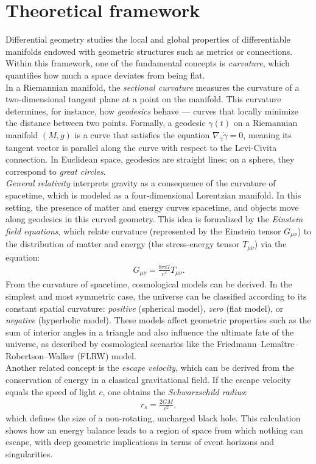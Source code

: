 \documentclass{aleph-revista}
\begin{document}
\section{Theoretical framework}
Differential geometry studies the local and global properties of differentiable manifolds endowed with geometric structures such as metrics or connections. Within this framework, one of the fundamental concepts is \textit{curvature}, which quantifies how much a space deviates from being flat.\\
In a Riemannian manifold, the \textit{sectional curvature} measures the curvature of a two-dimensional tangent plane at a point on the manifold. This curvature determines, for instance, how \textit{geodesics} behave — curves that locally minimize the distance between two points. Formally, a geodesic $\gamma(t)$ on a Riemannian manifold $(M,g)$ is a curve that satisfies the equation $\nabla_{\dot{\gamma}}\dot{\gamma} = 0$, meaning its tangent vector is parallel along the curve with respect to the Levi-Civita connection. In Euclidean space, geodesics are straight lines; on a sphere, they correspond to \textit{great circles}.\\
\textit{General relativity} interprets gravity as a consequence of the curvature of spacetime, which is modeled as a four-dimensional Lorentzian manifold. In this setting, the presence of matter and energy curves spacetime, and objects move along geodesics in this curved geometry. This idea is formalized by the \textit{Einstein field equations}, which relate curvature (represented by the Einstein tensor $G_{\mu\nu}$) to the distribution of matter and energy (the stress-energy tensor $T_{\mu\nu}$) via the equation:
\begin{align*}
  G_{\mu\nu} = \frac{8\pi G}{c^4} T_{\mu\nu}.
\end{align*}
From the curvature of spacetime, cosmological models can be derived. In the simplest and most symmetric case, the universe can be classified according to its constant spatial curvature: \textit{positive} (spherical model), \textit{zero} (flat model), or \textit{negative} (hyperbolic model). These models affect geometric properties such as the sum of interior angles in a triangle and also influence the ultimate fate of the universe, as described by cosmological scenarios like the Friedmann–Lemaître–Robertson–Walker (FLRW) model.\\
Another related concept is the \textit{escape velocity}, which can be derived from the conservation of energy in a classical gravitational field. If the escape velocity equals the speed of light $c$, one obtains the \textit{Schwarzschild radius}:
\begin{align*}
  r_s = \frac{2GM}{c^2},
\end{align*}
which defines the size of a non-rotating, uncharged black hole. This calculation shows how an energy balance leads to a region of space from which nothing can escape, with deep geometric implications in terms of event horizons and singularities.
\end{document}
